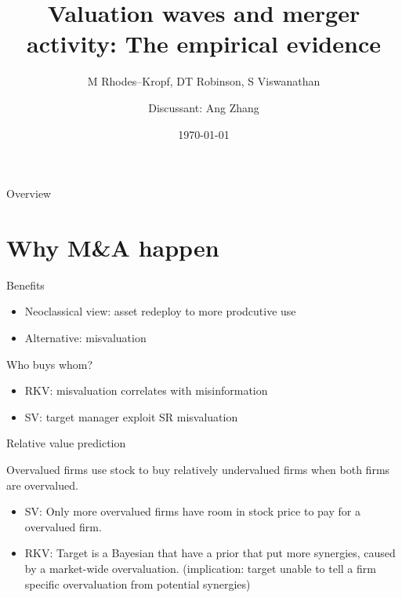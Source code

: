 \documentclass[aspectratio=169,xcolor=dvipsnames]{beamer}
\title{Valuation waves and merger activity: The empirical evidence}
\subtitle{M Rhodes–Kropf, DT Robinson, S Viswanathan}
\author{Discussant: Ang Zhang}
\date{\today} %
\begin{document}
\begin{frame}
    \titlepage
\end{frame}

\begin{frame}{Overview}
    \tableofcontents
\end{frame}

\section{Why M\&A happen}

\begin{frame}{}
    \begin{block}{Benefits}
        \begin{itemize}
            \item Neoclassical view: asset redeploy to more prodcutive use
            \item Alternative: misvaluation
        \end{itemize}
    \end{block}
    \begin{block}{Who buys whom?}
        \begin{itemize}
            \item RKV: misvaluation correlates with misinformation
            \item SV: target manager exploit SR misvaluation
        \end{itemize}
    \end{block}
\end{frame}


\begin{frame}{Relative value prediction}
    \begin{block}{Overvalued firms use stock to buy relatively undervalued firms when both firms are overvalued.}
        \begin{itemize}
            \item SV: Only more overvalued firms have room in stock price to pay for a overvalued firm.
            \item RKV: Target is a Bayesian that have a prior that put more synergies, caused by a market-wide overvaluation. (implication: target unable to tell a firm specific overvaluation from potential synergies)
        \end{itemize}
    \end{block}

\end{frame}
\end{document}
